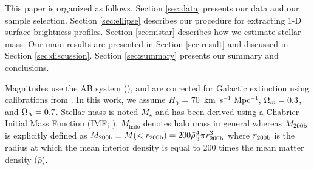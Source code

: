 \documentclass[a4paper,fleqn,usenatbib]{mnras}
\def\mstar{{$M_{\star}$}}
\begin{document}
    This paper is organized as follows. 
    Section \ref{sec:data} presents our data and our sample selection. 
    Section \ref{sec:ellipse} describes our procedure for extracting 1-D surface 
    brightness profiles. 
    Section \ref{sec:mstar} describes how we estimate stellar mass. 
    Our main results are presented in Section \ref{sec:result} and discussed in 
    Section \ref{sec:discussion}. 
    Section \ref{sec:summary} presents our summary and conclusions.

    Magnitudes use the AB system (\citealt{Oke1983}), and are corrected for Galactic 
    extinction using calibrations from \citet{Schlafly11}.
    In this work, we assume $H_0$ = 70~km~s$^{-1}$ Mpc$^{-1}$, ${\Omega}_{\rm m}=0.3$, 
    and ${\Omega}_{\rm \Lambda}=0.7$.
    Stellar mass is noted \mstar{} and has been derived using a Chabrier Initial Mass 
    Function (IMF; \citealt{Chabrier2003}).     
    $M_{\mathrm{halo}}$ denotes halo mass in general whereas $M_{\rm 200b}$ is 
    explicitly defined as $M_{\rm 200b}\equiv M(<r_{\rm 200b})=200\bar{\rho} 
    \frac{4}{3}\pi r_{\rm 200b}^3$ where $r_{\rm 200b}$
    is the radius at which the mean interior density is equal to 200 times
    the mean matter density ($\bar{\rho}$). 
    
\end{document}
